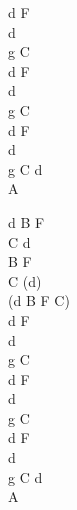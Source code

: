 \documentclass[a5paper, 10pt]{book}
\begin{document}
\begin{minipage}[t]{0.2\textwidth}
  d F\\
  d\\
  g C\\
  d F\\
  d\\
  g C\\
  d F\\
  d\\
  g C  d\\
  A\vspace*{1.9mm}

  d B F\\
  C d\\
  B F\\
  C (d)\\
  (d B F C)\\
  d F\\
  d\\
  g C\\
  d F\\
  d\\
  g C\\
  d F\\
  d\\
  g C  d\\
  A\\
\end{minipage}

\newpage
\end{document}
